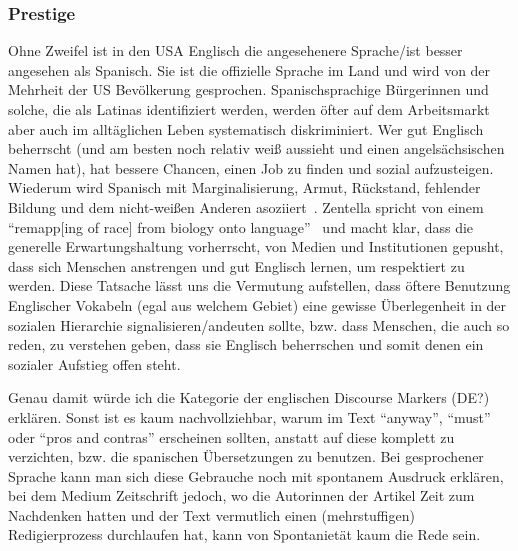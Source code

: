 \begin{comment}
Bei den Named Entities aber auch bei bestimmten andere Sachen, wie z.B. Rezeptzutaten
Hier kann man die Sozioindexikalität und die indexikalischen Felder wieder hervorrufen;
Zugehörigkeit auf verschiedenen Ebenen:
- Evokation(ist das ein Deutsches Wort?) einer bilinguale Identität/Komplizenschaft zwischen Herausgeberinnen und Leserinnen
- Zugehörigkeit zu einem hippen erfolgreichen Lifestyle (vlt geht das bereits auch in Prestige über?)


\end{comment}


\subsubsection{Prestige}
Ohne Zweifel ist in den USA Englisch die angesehenere Sprache/ist besser angesehen als Spanisch.
Sie ist die offizielle Sprache im Land und wird von der Mehrheit der US Bevölkerung gesprochen.
Spanischsprachige Bürgerinnen und solche, die als Latinas identifiziert werden, werden öfter auf dem Arbeitsmarkt aber auch im alltäglichen Leben systematisch diskriminiert.
Wer gut Englisch beherrscht (und am besten noch relativ weiß aussieht und einen angelsächsischen Namen hat), hat bessere Chancen, einen Job zu finden und sozial aufzusteigen.
Wiederum wird Spanisch mit Marginalisierung, Armut, Rückstand, fehlender Bildung und dem nicht-weißen Anderen asoziiert~\cite{Zentella07}. %
Zentella spricht von einem ``remapp[ing of race] from biology onto language''~\cite{Zentella07}
und macht klar, dass die generelle Erwartungshaltung vorherrscht, von Medien und Institutionen gepusht, dass sich Menschen anstrengen und gut Englisch lernen, um respektiert zu werden.
Diese Tatsache lässt uns die Vermutung aufstellen, dass öftere Benutzung Englischer Vokabeln (egal aus welchem Gebiet) eine gewisse Überlegenheit in der sozialen Hierarchie signalisieren/andeuten sollte, bzw. dass Menschen, die auch so reden, zu verstehen geben, dass sie Englisch beherrschen und somit denen ein sozialer Aufstieg offen steht.

Genau damit würde ich die Kategorie der englischen Discourse Markers (DE?) erklären.
Sonst ist es kaum nachvollziehbar, warum im Text ``anyway'', ``must'' oder ``pros and contras'' erscheinen sollten, anstatt auf diese komplett zu verzichten, bzw. die spanischen Übersetzungen zu benutzen. %
Bei gesprochener Sprache kann man sich diese Gebrauche noch mit spontanem Ausdruck erklären, bei dem Medium Zeitschrift jedoch, wo die Autorinnen der Artikel Zeit zum Nachdenken hatten und der Text vermutlich einen (mehrstuffigen) Redigierprozess durchlaufen hat, kann von Spontanietät kaum die Rede sein.

